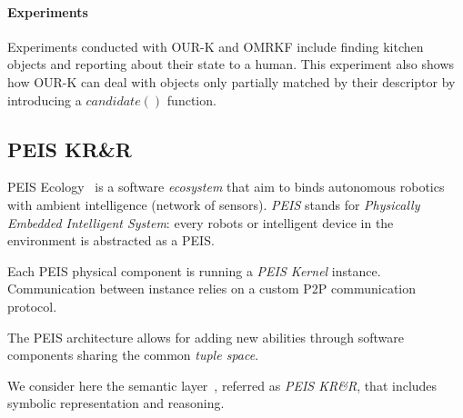 
\paragraph{Experiments} Experiments conducted with OUR-K and OMRKF include
finding kitchen objects and reporting about their state to a human.  This
experiment also shows how OUR-K can deal with objects only partially matched by
their descriptor by introducing a $candidate()$ function.

\subsection{PEIS KR\&R}
\label{sect|peis-ecology}

{\sc PEIS Ecology}~\cite{Saffiotti2005} is a software \emph{ecosystem} that aim
to binds autonomous robotics with ambient intelligence (network of sensors).
\emph{PEIS} stands for \emph{Physically Embedded Intelligent System}: every
robots or intelligent device in the environment is abstracted as a PEIS.

Each PEIS physical component is running a \emph{PEIS Kernel} instance.
Communication between instance relies on a custom P2P communication protocol.

The PEIS architecture allows for adding new abilities through software
components sharing the common \emph{tuple space}.

We consider here the semantic layer~\cite{Daoutis2009}, referred as \emph{PEIS
KR\&R}, that includes symbolic representation and reasoning.



